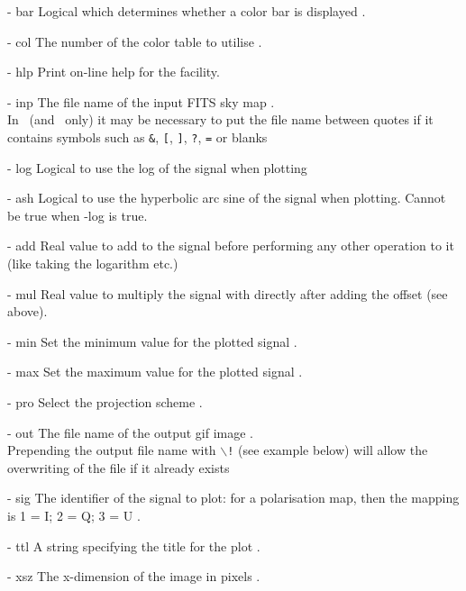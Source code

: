 \begin{qualifiers}
  \begin{qulist}{} %
    \item[{- bar}] Logical which determines whether a color bar is
      displayed . 
    \item[{- col}] The number of the color table to utilise .
    \item[{- hlp}] Print on-line help for the facility.
    \item[{- inp}] The file name of the input FITS sky map \nodefault.\\
In \thedocid\ (and \thedocid\ only) it may be necessary to put the file name between quotes if it contains symbols
such as {\tt \&}, {\tt [}, {\tt ]}, {\tt ?}, {\tt =}  or blanks
    \item[{- log}] Logical to use the log of the signal when plotting 
    \item[{- ash}] Logical to use the hyperbolic arc sine of the signal when
      plotting. Cannot be true when -log is true.
    \item[{- add}] Real value to add to the signal before performing any
      other operation to it (like taking the logarithm etc.)
    \item[{- mul}] Real value to multiply the signal with directly after
      adding the offset (see above).
    \item[{- min}] Set the minimum value for the plotted signal
    .
    \item[{- max}] Set the maximum value for the plotted signal
      .
    \item[{- pro}] Select the projection scheme .
    \item[{- out}] The file name of the output gif image \nodefault.\\
Prepending the output file name with {\tt $\backslash$!} (see example below) will allow the overwriting of the
file if it already exists
    \item[{- sig}] The identifier of the signal to plot: for a
      polarisation map, then the mapping is 1 = I; 2 = Q; 3 = U
      .
    \item[{- ttl}] A string specifying the title for the plot \nodefault.
    \item[{- xsz}] The x-dimension of the image in pixels .
  \end{qulist}
\end{qualifiers}


